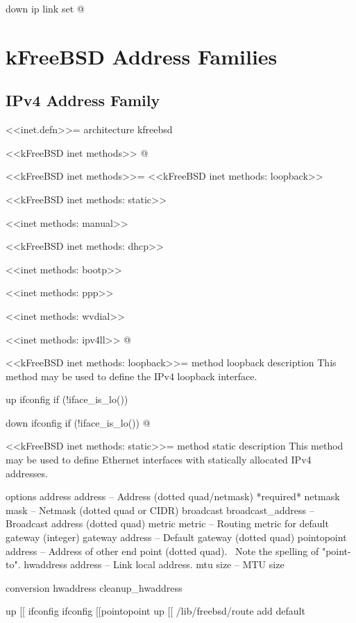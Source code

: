 \documentclass{article}
\begin{document}
  down
    ip link set %
@

\section{kFreeBSD Address Families}
\subsection{IPv4 Address Family}

<<inet.defn>>=
architecture kfreebsd

<<kFreeBSD inet methods>>
@ 

<<kFreeBSD inet methods>>=
<<kFreeBSD inet methods: loopback>>

<<kFreeBSD inet methods: static>>

<<inet methods: manual>>

<<kFreeBSD inet methods: dhcp>>

<<inet methods: bootp>>

<<inet methods: ppp>>

<<inet methods: wvdial>>

<<inet methods: ipv4ll>>
@ 

<<kFreeBSD inet methods: loopback>>=
method loopback
  description
    This method may be used to define the IPv4 loopback interface.

  up
    ifconfig %
	if (!iface_is_lo())

  down
    ifconfig %
	if (!iface_is_lo())
@ 

<<kFreeBSD inet methods: static>>=
method static
  description
    This method may be used to define Ethernet interfaces with statically
    allocated IPv4 addresses.
      
  options
    address address             -- Address (dotted quad/netmask) *required*
    netmask mask                -- Netmask (dotted quad or CIDR)
    broadcast broadcast_address -- Broadcast address (dotted quad)
    metric metric               -- Routing metric for default gateway (integer)
    gateway address             -- Default gateway (dotted quad)
    pointopoint address         -- Address of other end point (dotted quad). \
                                   Note the spelling of "point-to".
    hwaddress address           -- Link local address.
    mtu size                    -- MTU size

  conversion
    hwaddress cleanup_hwaddress

  up
    [[ ifconfig %
    ifconfig %
	[[pointopoint %
	up
    [[ /lib/freebsd/route add default %
\end{document}
